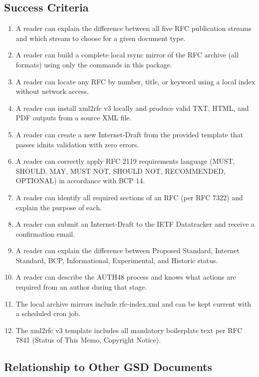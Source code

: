 \documentclass[11pt,letterpaper]{article}
\begin{document}
\subsection{Success Criteria}

\begin{enumerate}
  \item A reader can explain the difference between all five RFC publication streams and which stream to choose for a given document type.
  \item A reader can build a complete local rsync mirror of the RFC archive (all formats) using only the commands in this package.
  \item A reader can locate any RFC by number, title, or keyword using a local index without network access.
  \item A reader can install xml2rfc v3 locally and produce valid TXT, HTML, and PDF outputs from a source XML file.
  \item A reader can create a new Internet-Draft from the provided template that passes idnits validation with zero errors.
  \item A reader can correctly apply RFC 2119 requirements language (MUST, SHOULD, MAY, MUST NOT, SHOULD NOT, RECOMMENDED, OPTIONAL) in accordance with BCP 14.
  \item A reader can identify all required sections of an RFC (per RFC 7322) and explain the purpose of each.
  \item A reader can submit an Internet-Draft to the IETF Datatracker and receive a confirmation email.
  \item A reader can explain the difference between Proposed Standard, Internet Standard, BCP, Informational, Experimental, and Historic status.
  \item A reader can describe the AUTH48 process and knows what actions are required from an author during that stage.
  \item The local archive mirrors include rfc-index.xml and can be kept current with a scheduled cron job.
  \item The xml2rfc v3 template includes all mandatory boilerplate text per RFC 7841 (Status of This Memo, Copyright Notice).
\end{enumerate}

\subsection{Relationship to Other GSD Documents}
\end{document}
